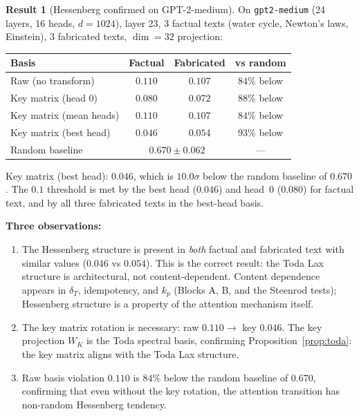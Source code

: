 \documentclass[11pt]{amsart}
\theoremstyle{definition}
\newtheorem{result}[theorem]{Result}
\begin{document}
\begin{result}[Hessenberg confirmed on GPT-2-medium]
\label{result:hessenberg}
On \texttt{gpt2-medium} (24 layers, 16 heads, $d=1024$),
layer 23, 3 factual texts (water cycle, Newton's laws, Einstein),
3 fabricated texts, $\dim=32$ projection:

\begin{center}
\begin{tabular}{@{}lccc@{}}
\toprule
Basis & Factual & Fabricated & vs random \\
\midrule
Raw (no transform) & $0.110$ & $0.107$ & $84\%$ below \\
Key matrix (head 0) & $0.080$ & $0.072$ & $88\%$ below \\
Key matrix (mean heads) & $0.110$ & $0.107$ & $84\%$ below \\
Key matrix (best head) & $\mathbf{0.046}$ & $0.054$ & $93\%$ below \\
\midrule
Random baseline & \multicolumn{2}{c}{$0.670 \pm 0.062$} & --- \\
\bottomrule
\end{tabular}
\end{center}

Key matrix (best head): $0.046$, which is $10.0\sigma$ below the random
baseline of $0.670$.
The $0.1$ threshold is met by the best head ($0.046$) and head~0 ($0.080$)
for factual text, and by all three fabricated texts in the best-head basis.

\textbf{Three observations:}
\begin{enumerate}
\item The Hessenberg structure is present in \emph{both} factual and
  fabricated text with similar values ($0.046$ vs $0.054$).
  This is the correct result: the Toda Lax structure is architectural,
  not content-dependent.
  Content dependence appears in $\delta_T$, idempotency, and $k_p$
  (Blocks A, B, and the Steenrod tests); Hessenberg structure is
  a property of the attention mechanism itself.
\item The key matrix rotation is necessary: raw $0.110 \to$ key $0.046$.
  The key projection $W_K$ is the Toda spectral basis,
  confirming Proposition~\ref{prop:toda}:
  the key matrix aligns with the Toda Lax structure.
\item Raw basis violation $0.110$ is $84\%$ below the random baseline
  of $0.670$, confirming that even without the key rotation,
  the attention transition has non-random Hessenberg tendency.
\end{enumerate}


\end{result}
\end{document}
